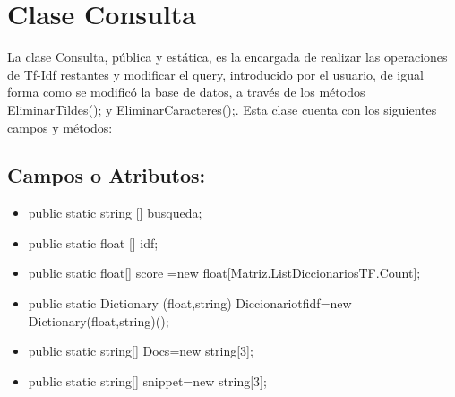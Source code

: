\documentclass[a4paper,12pt]{article}
\begin{document}
\newpage
\section*{Clase Consulta}

La clase Consulta, pública y estática, es la encargada de realizar las operaciones de Tf-Idf 
restantes y modificar el query, introducido por el usuario, de igual forma como se modificó la 
base de datos, a través de los métodos EliminarTildes(); y EliminarCaracteres();. Esta clase 
cuenta con los siguientes campos y métodos:
\subsection*{Campos o Atributos:}
\begin{itemize}
    \item public static string [] busqueda;
\item public static float [] idf;
\item public static float[] score =new float[Matriz.ListDiccionariosTF.Count]; 
    \item public static Dictionary (float,string) Diccionariotfidf=new Dictionary(float,string)();
    \item public static string[] Docs=new string[3];
    \item public static string[] snippet=new string[3];
 \end{itemize}
\end{document}
